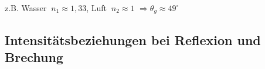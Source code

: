 z.B. Wasser $ \ n_1 \approx 1{,}33 $, Luft $ \ n_2 \approx 1 $ $ \Rightarrow \theta_g \approx 49 ^\circ $
\begin{comment}
\begin{tikzpicture}
\draw[->] (-5,0) -- (5,0);
\draw[->] (0,-5) -- (0,5);
\draw [domain=-3.75:3.75, samples=100] plot (\x, {2 * cos(1 / 4 * 15 * \x r) * exp(- (\x)^(2) * 0.25});
\end{tikzpicture}
\end{comment}


\subsection{Intensitätsbeziehungen bei Reflexion und Brechung}

